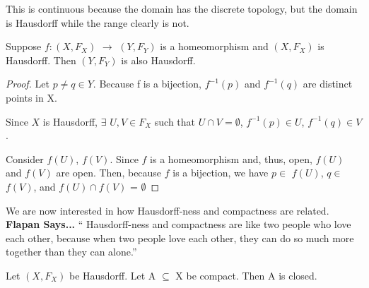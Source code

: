     This is continuous because the domain has the discrete topology, but the domain is Hausdorff while the range clearly is not.
    
\begin{smallfact}
    Suppose $f \colon (X, F_X)$ $\to$ $(Y, F_Y)$ is a homeomorphism and $(X, F_X)$ is Hausdorff. Then $(Y, F_Y)$ is also Hausdorff.
\end{smallfact}
    
    \begin{proof}
     Let $p \neq q \in Y$. Because f is a bijection, $f^{-1}(p)$ and $f^{-1}(q)$ are distinct points in X.

    Since $X$ is Hausdorff, $\exists$ $U, V \in F_X$ such that $U \cap V = \emptyset$, $f^{-1}(p) \in U$, $f^{-1}(q) \in V$.

    Consider $f(U)$, $f(V)$. Since $f$ is a homeomorphism and, thus, open, $f(U)$ and $f(V)$ are open. Then, because $f$ is a bijection, we have $p \in$ $f(U)$, $q \in$ $f(V)$, and $f(U) \cap f(V)$ = $\emptyset$
    \end{proof}
    
    We are now interested in how Hausdorff-ness and compactness are related.\\
    
     \textbf{Flapan Says...} `` Hausdorff-ness and compactness are like two people who love each other, because when two people love each other, they can do so much more together than they can alone.'' \\

\begin{theorem}
Let $(X, F_X)$ be Hausdorff. Let A $\subseteq$ X be compact. Then A is closed.
\end{theorem}
     
